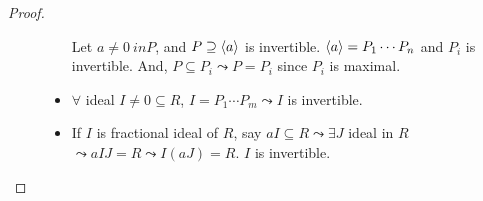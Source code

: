 \begin{theorem}
\begin{proof}
\begin{description}
\begin{itemize}
          Let $a \neq 0 \ in P$, and $P \supseteq \langle a\rangle$ is invertible. $\langle a\rangle
            = P_1 \cdots P_n$ and $P_i$ is invertible. And, $P \subseteq P_i 
            \leadsto P = P_i$ since $P_i$ is maximal.
        \item $\forall$ ideal $I \neq 0 \subseteq R$, $I = P_1 \cdots P_m \leadsto 
          I$ is invertible.
        \item If $I$ is fractional ideal of $R$, say $aI \subseteq R \leadsto 
          \exists J$ ideal in $R$ $\leadsto aIJ = R \leadsto I(aJ) = R$. $I$ is
            invertible.
        \end{itemize}
  \end{description}
  \end{proof}
\end{theorem}
